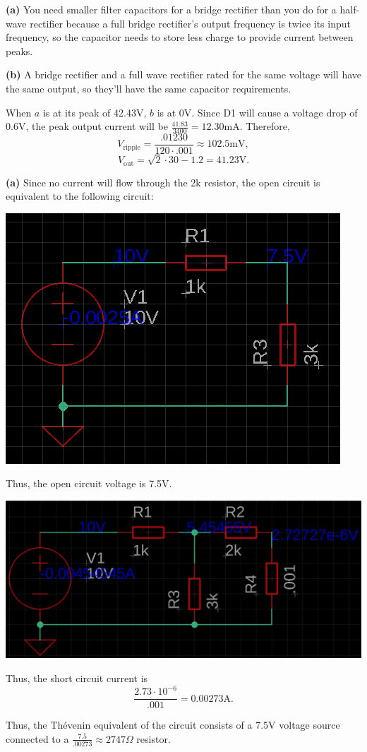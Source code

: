 \documentclass{article}
\begin{document}
\newpage{}

    {\bf (a)} You need smaller filter capacitors for a bridge rectifier than you do for a half-wave rectifier because a full bridge rectifier's output frequency is twice its input frequency, so the capacitor needs to store less charge to provide current between peaks.

    {\bf (b)} A bridge rectifier and a full wave rectifier rated for the same voltage will have the same output, so they'll have the same capacitor requirements.

\newpage{}

    When $a$ is at its peak of 42.43V, $b$ is at 0V.
    Since D1 will cause a voltage drop of 0.6V, the peak output current will be $\frac{41.83}{3400} = 12.30$mA.
    Therefore, $$V_{\text{ripple}} = \frac{.01230}{120 \cdot .001} \approx 102.5\text{mV},$$
    $$V_{\text{out}} = \sqrt{2} \cdot 30 - 1.2 = 41.23\text{V}.$$


\newpage{}



\newpage{}

{\bf (a)}
Since no current will flow through the 2k resistor, the open circuit is equivalent to the following circuit:
\begin{center}
\includegraphics[scale=.5]{schematic04.png}
\end{center}
Thus, the open circuit voltage is 7.5V.

\begin{center}
\includegraphics[scale=0.25]{schematic042.png}
\end{center}
Thus, the short circuit current is $$\frac{2.73 \cdot 10^{-6}}{.001} = 0.00273\text{A}.$$

Thus, the Thévenin equivalent of the circuit consists of a 7.5V voltage source connected to a $\frac{7.5}{.00273} \approx 2747\Omega$ resistor.
\end{document}
